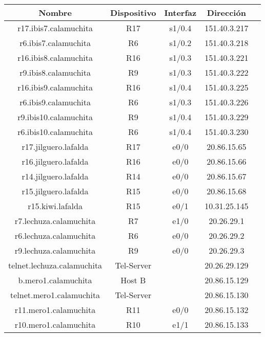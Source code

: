 \begin{tabular}{|c|c|c|c|c|}
	\hline
	Nombre & Dispositivo & Interfaz & Dirección \\
	\hline

	\hline
	r17.ibis7.calamuchita & R17 & s1/0.4 & 151.40.3.217 \\
	\hline
	r6.ibis7.calamuchita & R6 & s1/0.2 & 151.40.3.218 \\
	\hline

	\hline
	r16.ibis8.calamuchita & R16 & s1/0.3 & 151.40.3.221 \\
	\hline
	r9.ibis8.calamuchita & R9 & s1/0.3 & 151.40.3.222 \\
	\hline

	\hline
	r16.ibis9.calamuchita & R16 & s1/0.4 & 151.40.3.225 \\
	\hline
	r6.ibis9.calamuchita & R6 & s1/0.3 & 151.40.3.226 \\
	\hline

	\hline
	r9.ibis10.calamuchita & R9 & s1/0.4 & 151.40.3.229 \\
	\hline
	r6.ibis10.calamuchita & R6 & s1/0.4 & 151.40.3.230 \\
	\hline

	\hline
	r17.jilguero.lafalda & R17 & e0/0 & 20.86.15.65 \\
	\hline
	r16.jilguero.lafalda & R16 & e0/0 & 20.86.15.66 \\
	\hline
	r14.jilguero.lafalda & R14 & e0/0 & 20.86.15.67 \\
	\hline
	r15.jilguero.lafalda & R15 & e0/0 & 20.86.15.68 \\
	\hline

	\hline
	r15.kiwi.lafalda & R15 & e0/1 & 10.31.25.145 \\
	\hline

	\hline
	r7.lechuza.calamuchita & R7 & e1/0 & 20.26.29.1 \\
	\hline
	r6.lechuza.calamuchita & R6 & e0/0 & 20.26.29.2 \\
	\hline
	r9.lechuza.calamuchita & R9 & e0/0 & 20.26.29.3 \\
	\hline
	telnet.lechuza.calamuchita & Tel-Server & & 20.26.29.129 \\
	\hline

	\hline
	b.mero1.calamuchita & Host B & & 20.86.15.129 \\
	\hline
	telnet.mero1.calamuchita & Tel-Server & & 20.86.15.130 \\
	\hline
	r11.mero1.calamuchita & R11 & e0/0 & 20.86.15.132 \\
	\hline
	r10.mero1.calamuchita & R10 & e1/1 & 20.86.15.133 \\
	\hline


\end{tabular}
